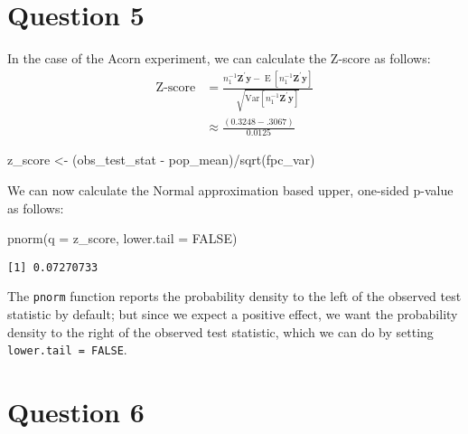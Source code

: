 \documentclass[
  12pt,
  leqno]{article}
\newenvironment{Shaded}{\begin{snugshade}}{\end{snugshade}}
\newcommand{\AttributeTok}[1]{\textcolor[rgb]{0.77,0.63,0.00}{#1}}
\newcommand{\ConstantTok}[1]{\textcolor[rgb]{0.00,0.00,0.00}{#1}}
\newcommand{\FunctionTok}[1]{\textcolor[rgb]{0.00,0.00,0.00}{#1}}
\newcommand{\NormalTok}[1]{#1}
\newcommand{\OtherTok}[1]{\textcolor[rgb]{0.56,0.35,0.01}{#1}}
\newcommand{\SpecialCharTok}[1]{\textcolor[rgb]{0.00,0.00,0.00}{#1}}
\DeclareMathOperator{\E}{\mathrm{E}}
\DeclareMathOperator{\1}{\mathbbm{1}}
\begin{document}
\section*{Question 5}

In the case of the Acorn experiment, we can calculate the Z-score as
follows: \begin{align*}
\text{Z-score} & = \frac{n_1^{-1}\mathbf{Z}^{\prime}\mathbf{y} - \E\left[n_1^{-1}\mathbf{Z}^{\prime}\mathbf{y}\right]}{\sqrt{\mathrm{Var}\left[n_1^{-1}\mathbf{Z}^{\prime}\mathbf{y}\right]}} \\
& \approx \frac{\left(0.3248 - .3067\right)}{0.0125}
\end{align*}

\scriptsize

\begin{Shaded}
\begin{Highlighting}[]
\NormalTok{z\_score }\OtherTok{\textless{}{-}}\NormalTok{ (obs\_test\_stat }\SpecialCharTok{{-}}\NormalTok{ pop\_mean)}\SpecialCharTok{/}\FunctionTok{sqrt}\NormalTok{(fpc\_var)}
\end{Highlighting}
\end{Shaded}

\normalsize

We can now calculate the Normal approximation based upper, one-sided
p-value as follows:

\scriptsize

\begin{Shaded}
\begin{Highlighting}[]
\FunctionTok{pnorm}\NormalTok{(}\AttributeTok{q =}\NormalTok{ z\_score, }\AttributeTok{lower.tail =} \ConstantTok{FALSE}\NormalTok{)}
\end{Highlighting}
\end{Shaded}

\begin{verbatim}
[1] 0.07270733
\end{verbatim}

\normalsize

The \texttt{pnorm} function reports the probability density to the left
of the observed test statistic by default; but since we expect a
positive effect, we want the probability density to the right of the
observed test statistic, which we can do by setting
\texttt{lower.tail = FALSE}.

\section*{Question 6}
\end{document}
